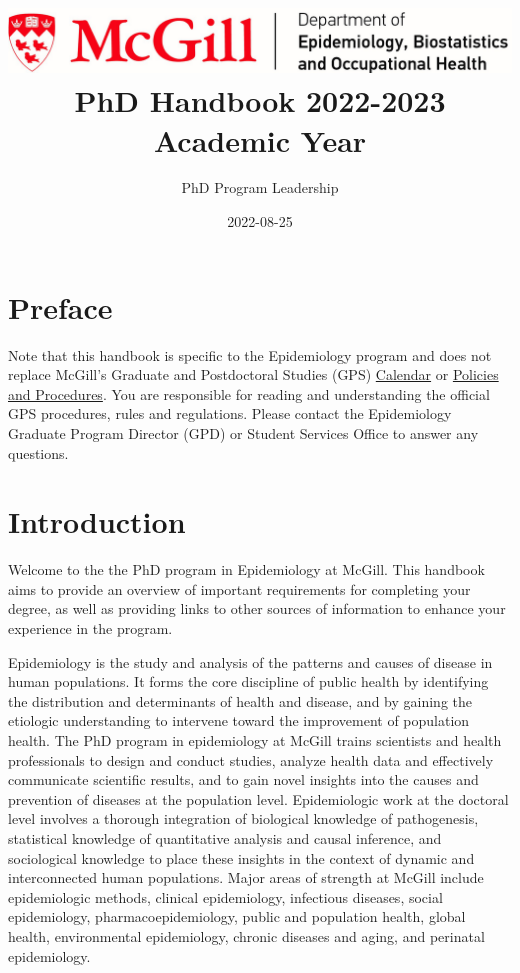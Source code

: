 \documentclass[
  openany]{book}
\title{\includegraphics[width=6.25in,height=\textheight]{mcgill-epi-logo.png} PhD Handbook 2022-2023 Academic Year}
\author{PhD Program Leadership}
\date{2022-08-25}
\begin{document}
\maketitle

{
\hypersetup{linkcolor=}
\setcounter{tocdepth}{1}
\tableofcontents
}
\hypertarget{preface}{%
\chapter*{Preface}\label{preface}}

Note that this handbook is specific to the Epidemiology program and does not replace McGill's Graduate and Postdoctoral Studies (GPS) \href{https://www.mcgill.ca/students/courses/calendars/}{Calendar} or \href{https://www.mcgill.ca/gps/students/policies-and-guidelines}{Policies and Procedures}. You are responsible for reading and understanding the official GPS procedures, rules and regulations. Please contact the Epidemiology Graduate Program Director (GPD) or Student Services Office to answer any questions.

\hypertarget{introduction}{%
\chapter{Introduction}\label{introduction}}

Welcome to the the PhD program in Epidemiology at McGill. This handbook aims to provide an overview of important requirements for completing your degree, as well as providing links to other sources of information to enhance your experience in the program.

Epidemiology is the study and analysis of the patterns and causes of disease in human populations. It forms the core discipline of public health by identifying the distribution and determinants of health and disease, and by gaining the etiologic understanding to intervene toward the improvement of population health. The PhD program in epidemiology at McGill trains scientists and health professionals to design and conduct studies, analyze health data and effectively communicate scientific results, and to gain novel insights into the causes and prevention of diseases at the population level. Epidemiologic work at the doctoral level involves a thorough integration of biological knowledge of pathogenesis, statistical knowledge of quantitative analysis and causal inference, and sociological knowledge to place these insights in the context of dynamic and interconnected human populations. Major areas of strength at McGill include epidemiologic methods, clinical epidemiology, infectious diseases, social epidemiology, pharmacoepidemiology, public and population health, global health, environmental epidemiology, chronic diseases and aging, and perinatal epidemiology.
\end{document}
